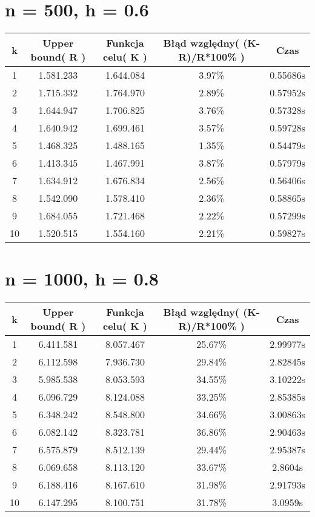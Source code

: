 \documentclass[12pt,a4paper]{article}
\begin{document}
\newpage

\section{n = 500, h = 0.6}
\begin{table}[!h]
 \begin{tabular}{|c|c|c|c|c|} 
	\hline
	 k&Upper bound( R )&Funkcja celu( K )&Błąd względny( (K-R)/R*100\% )&Czas\\ \hline
	1&1.581.233&1.644.084&3.97\%&0.55686s\\ \hline
	2&1.715.332&1.764.970&2.89\%&0.57952s\\ \hline
	3&1.644.947&1.706.825&3.76\%&0.57328s\\ \hline
	4&1.640.942&1.699.461&3.57\%&0.59728s\\ \hline
	5&1.468.325&1.488.165&1.35\%&0.54479s\\ \hline
	6&1.413.345&1.467.991&3.87\%&0.57979s\\ \hline
	7&1.634.912&1.676.834&2.56\%&0.56406s\\ \hline
	8&1.542.090&1.578.410&2.36\%&0.58865s\\ \hline
	9&1.684.055&1.721.468&2.22\%&0.57299s\\ \hline
	10&1.520.515&1.554.160&2.21\%&0.59827s\\ \hline
 \end{tabular}
 	\centering
\end{table}

\section{n = 1000, h = 0.8}
\begin{table}[!h]
 \begin{tabular}{|c|c|c|c|c|} 
	\hline
	 k&Upper bound( R )&Funkcja celu( K )&Błąd względny( (K-R)/R*100\% )&Czas\\ \hline
	1&6.411.581&8.057.467&25.67\%&2.99977s\\ \hline
	2&6.112.598&7.936.730&29.84\%&2.82845s\\ \hline
	3&5.985.538&8.053.593&34.55\%&3.10222s\\ \hline
	4&6.096.729&8.124.088&33.25\%&2.85385s\\ \hline
	5&6.348.242&8.548.800&34.66\%&3.00863s\\ \hline
	6&6.082.142&8.323.781&36.86\%&2.90463s\\ \hline
	7&6.575.879&8.512.139&29.44\%&2.95387s\\ \hline
	8&6.069.658&8.113.120&33.67\%&2.8604s\\ \hline
	9&6.188.416&8.167.610&31.98\%&2.91793s\\ \hline
	10&6.147.295&8.100.751&31.78\%&3.0959s\\ \hline
 \end{tabular}
 	\centering
\end{table}
\end{document}
